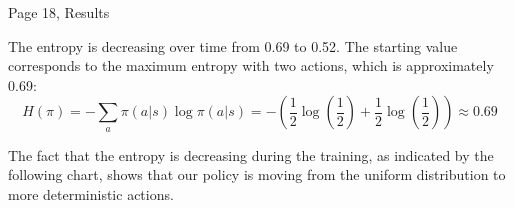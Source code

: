 Page 18, Results

The entropy is decreasing over time from 0.69 to 0.52. The starting value corresponds to the maximum entropy with two actions, which is approximately 0.69: 
\begin{equation*}
H(\pi) = -\sum_a \pi(a|s)\log \pi(a|s) = - (\frac{1}{2} \log(\frac{1}{2}) + \frac{1}{2} \log(\frac{1}{2})) \approx 0.69
\end{equation*}

The fact that the entropy is decreasing during the training, as indicated by the following chart,   shows that our policy is moving from the uniform distribution to more deterministic actions.



